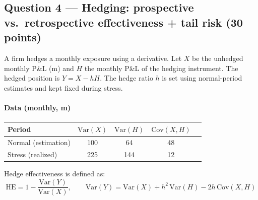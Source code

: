 \documentclass[11pt,a4paper]{article}
\begin{document}
\subsection*{Question 4 --- Hedging: prospective vs.\ retrospective effectiveness + tail risk \hfill (30 points)}

A firm hedges a monthly exposure using a derivative.
Let $X$ be the unhedged monthly P\&L (\texteuro{}m) and $H$ the monthly P\&L of the hedging instrument.
The hedged position is $Y = X - hH$.
The hedge ratio $h$ is set using normal-period estimates and kept fixed during stress.

\paragraph{Data (monthly, \texteuro{}m)}

\noindent
\begin{tabular}{lcccc}
\toprule
Period & $\mathrm{Var}(X)$ & $\mathrm{Var}(H)$ & $\mathrm{Cov}(X,H)$ \\
\midrule
Normal (estimation) & 100 & 64 & 48 \\
Stress (realized)   & 225 & 144 & 12 \\
\bottomrule
\end{tabular}

\medskip
Hedge effectiveness is defined as:
\[
\text{HE} = 1-\frac{\mathrm{Var}(Y)}{\mathrm{Var}(X)}, \qquad
\mathrm{Var}(Y) = \mathrm{Var}(X) + h^2\,\mathrm{Var}(H) - 2h\,\mathrm{Cov}(X,H)
\]
\end{document}
